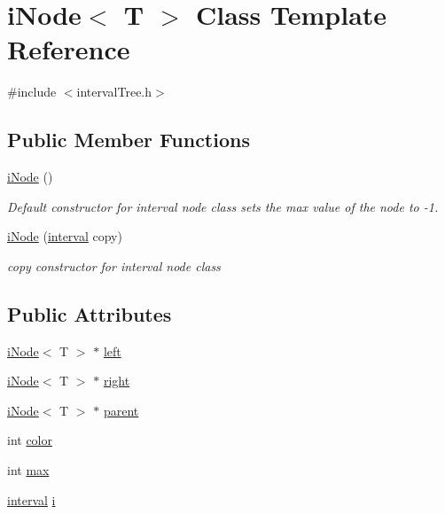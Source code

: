 \hypertarget{classi_node}{\section{i\-Node$<$ T $>$ Class Template Reference}
\label{classi_node}
}


{\ttfamily \#include $<$interval\-Tree.\-h$>$}

\subsection*{Public Member Functions}
\begin{DoxyCompactItemize}
\item 
\hyperlink{classi_node_acfa80f0589c2c2dcc89a44fb6b41555a}{i\-Node} ()
\begin{DoxyCompactList}\small\item\em Default constructor for interval node class sets the max value of the node to -\/1. \end{DoxyCompactList}\item 
\hyperlink{classi_node_acfd53858d6a78fc7a1c09d0e442104c4}{i\-Node} (\hyperlink{classinterval}{interval} copy)
\begin{DoxyCompactList}\small\item\em copy constructor for interval node class \end{DoxyCompactList}\end{DoxyCompactItemize}
\subsection*{Public Attributes}
\begin{DoxyCompactItemize}
\item 
\hyperlink{classi_node}{i\-Node}$<$ T $>$ $\ast$ \hyperlink{classi_node_a7345e2239c8d643b56b5aa7193f6c85c}{left}
\item 
\hyperlink{classi_node}{i\-Node}$<$ T $>$ $\ast$ \hyperlink{classi_node_a5a10f40c1df5dd9d5391b7ca02919597}{right}
\item 
\hyperlink{classi_node}{i\-Node}$<$ T $>$ $\ast$ \hyperlink{classi_node_a135b6475b43e4d1389cc620f57b2a6c8}{parent}
\item 
int \hyperlink{classi_node_aa7ba0802d39c1bce4004f44f906f84a2}{color}
\item 
int \hyperlink{classi_node_adcb3b4ff4d6a266af36e930f494e10db}{max}
\item 
\hyperlink{classinterval}{interval} \hyperlink{classi_node_ad904f3d2430c5c0bce7f9bf840a4bad9}{i}
\end{DoxyCompactItemize}


